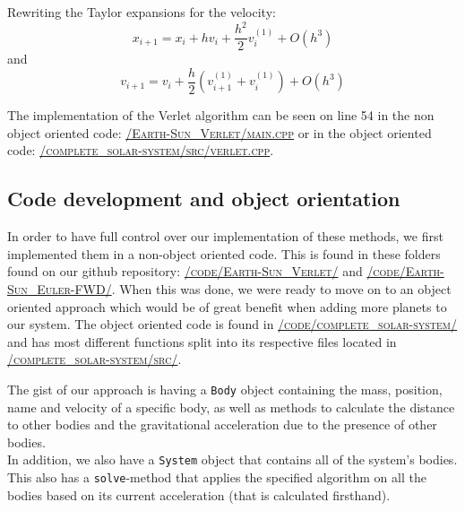\documentclass[../main.tex]{subfiles}
\begin{document}
Rewriting the Taylor expansions for the velocity:
$$x_{i+1} = x_i + hv_i + \frac{h^2}{2} v_i^{(1)} + O(h^3)$$
and
$$v_{i+1} = v_i + \frac{h}{2} \left(v_{i+1}^{(1)} + v_i^{(1)}\right) + O(h^3)$$

The implementation of the Verlet algorithm can be seen on line 54 in the non object oriented code: \href{https://github.com/kmaasrud/Project-5/blob/master/code/Earth-Sun_Verlet/main.cpp}{\textsc{/Earth-Sun\_Verlet/main.cpp}} or in the object oriented code: \href{https://github.com/kmaasrud/Project-5/blob/master/code/complete_solar-system/src/verlet.cpp}{\textsc{/complete\_solar-system/src/verlet.cpp}}.


\subsection{Code development and object orientation}
In order to have full control over our implementation of these methods, we first implemented them in a non-object oriented code. This is found in these folders found on our github repository\cite{repository}: \href{https://github.com/kmaasrud/Project-5/blob/master/code/Earth-Sun_Verlet/}{\textsc{/code/Earth-Sun\_Verlet/}} and \href{https://github.com/kmaasrud/Project-5/blob/master/code/Earth-Sun_Euler-FWD/}{\textsc{/code/Earth-Sun\_Euler-FWD/}}. When this was done, we were ready to move on to an object oriented approach which would be of great benefit when adding more planets to our system.
The object oriented code is found in \href{https://github.com/kmaasrud/Project-5/blob/master/code/complete_solar-system/}{\textsc{/code/complete\_solar-system/}} and has most different functions split into its respective files located in \href{https://github.com/kmaasrud/Project-5/blob/master/code/complete_solar-system/src/}{\textsc{/complete\_solar-system/src/}}.

The gist of our approach is having a \verb+Body+ object containing the mass, position, name and velocity of a specific body, as well as methods to calculate the distance to other bodies and the gravitational acceleration due to the presence of other bodies. \\
In addition, we also have a \verb+System+ object that contains all of the system's bodies. This also has a \verb+solve+-method that applies the specified algorithm on all the bodies based on its current acceleration (that is calculated firsthand). \\
\end{document}
